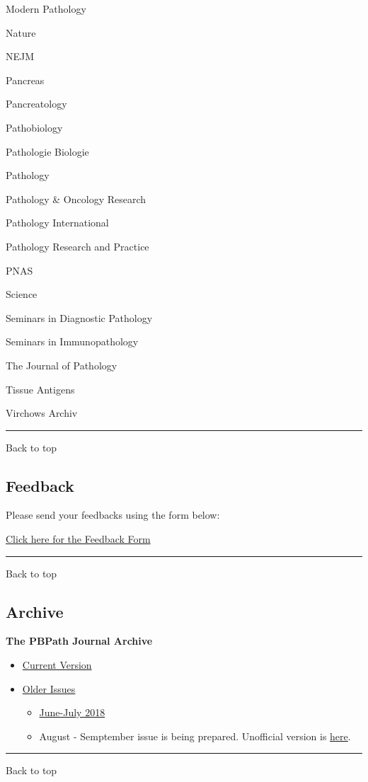\documentclass[]{article}
\begin{document}
Modern Pathology

Nature

NEJM

Pancreas

Pancreatology

Pathobiology

Pathologie Biologie

Pathology

Pathology \& Oncology Research

Pathology International

Pathology Research and Practice

PNAS

Science

Seminars in Diagnostic Pathology

Seminars in Immunopathology

The Journal of Pathology

Tissue Antigens

Virchows Archiv

\begin{center}\rule{0.5\linewidth}{\linethickness}\end{center}

Back to top

\pagebreak

\hypertarget{feedback}{%
\subsection{Feedback}\label{feedback}}

Please send your feedbacks using the form below:

\href{https://docs.google.com/forms/d/e/1FAIpQLSeD3Z9J6Y7eMmiyM12f_SfAmHUlykb1zxZcwO6lg7cebGYQIQ/viewform}{Click
here for the Feedback Form}

\begin{center}\rule{0.5\linewidth}{\linethickness}\end{center}

Back to top

\pagebreak

\hypertarget{archive}{%
\subsection{Archive}\label{archive}}

\textbf{The PBPath Journal Archive}

\begin{itemize}
\item
  \href{http://pbpath.org/journal-watch/}{Current Version}
\item
  \href{http://pbpath.org/journal-watch-archive/}{Older Issues}

  \begin{itemize}
  \item
    \href{}{June-July 2018}
  \item
    August - Semptember issue is being prepared. Unofficial version is
    \href{http://pbpath.org/journal-watch-upcoming-issue/}{here}.
  \end{itemize}
\end{itemize}

\begin{center}\rule{0.5\linewidth}{\linethickness}\end{center}

Back to top
\end{document}
